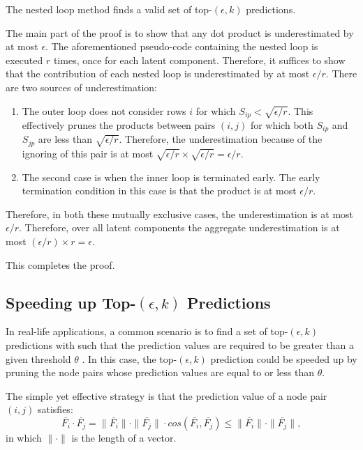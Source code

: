 \begin{prop}
\label{prop-valid-topk}
The nested loop method finds a valid set of top-$(\epsilon, k)$
predictions.
\end{prop}
\begin{IEEEproof}
The main part of the proof is to show that any dot product is
underestimated by at most  $\epsilon$. The aforementioned pseudo-code
containing the  nested loop is executed $r$ times, once for each
latent component. Therefore, it suffices to show that the
contribution of each nested loop is underestimated by at most
$\epsilon/r$. There are two sources of underestimation:
\begin{enumerate}
\item  The outer loop does not consider rows $i$ for which $S_{ip} <
\sqrt{\epsilon/r}$. This effectively prunes the products between
pairs $(i, j)$ for which both $S_{ip}$ and $S_{jp}$ are less
than $\sqrt{\epsilon/r}$. Therefore, the underestimation because of
the ignoring of this pair is at most $\sqrt{\epsilon/r} \times
\sqrt{\epsilon/r} = \epsilon/r$.
\item The second case is when the inner loop is terminated early.
The early termination condition in this case is that the product is
at most $\epsilon/r$.
\end{enumerate}
Therefore, in both these mutually exclusive cases, the
underestimation is at most $\epsilon/r$. Therefore, over all latent
components the aggregate underestimation is at most
$(\epsilon/r)\times r= \epsilon$.

This completes the proof.
\end{IEEEproof}

\subsection{Speeding up Top-$(\epsilon, k)$ Predictions}
\label{sec-NMF-topk-optimization}


 In real-life applications,
a common scenario is to find a set of top-$(\epsilon, k)$ predictions with such that the prediction
values are required to be greater than a given threshold $\theta$ \cite{ballard2015, lemp}. In this case,
the top-$(\epsilon, k)$ prediction could be speeded up by pruning the node pairs whose prediction values are equal to or less than $\theta$.

The simple yet effective strategy is that the prediction value of a node pair $(i, j)$ satisfies:
\begin{equation}
\label{equation-length}
\overline{F_i} \cdot \overline{F_j} = \|\overline{F_i} \| \cdot \| \overline{F_j} \| \cdot
cos(\overline{F_i}, \overline{F_j}) \leq \|\overline{F_i} \| \cdot \| \overline{F_j} \|, 
\end{equation} in which $\|\cdot\|$ is the length of a vector.

